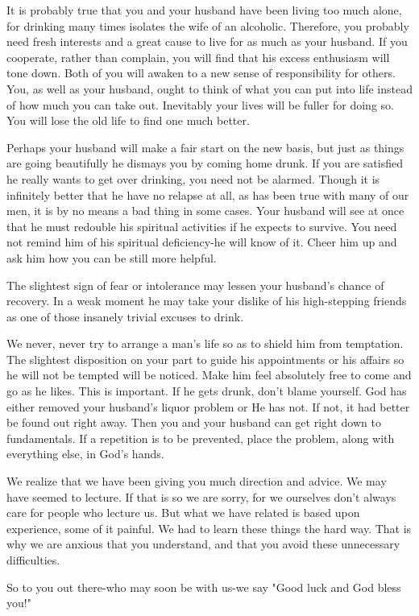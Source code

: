 \begin{biblechapter}
It is probably true that you and your husband have been living too much alone, for drinking many times isolates the wife of an alcoholic.  Therefore, you probably need fresh interests and a great cause to live for as much as your husband.  If you cooperate, rather than complain, you will find that his excess enthusiasm will tone down.  Both of you will awaken to a new sense of responsibility for others. You, as well as your husband, ought to think of what you can put into life instead of how much you can take out.  Inevitably your lives will be fuller for doing so.  You will lose the old life to find one much better.

Perhaps your husband will make a fair start on the new basis, but just as things are going beautifully he dismays you by coming home drunk.  If you are satisfied he really wants to get over drinking, you need not be alarmed.  Though it is infinitely better that he have no relapse at all, as has been true with many of our men, it is by no means a bad thing in some cases.  Your husband will see at once that he must redouble his spiritual activities if he expects to survive.  You need not remind him of his spiritual deficiency-he will know of it.  Cheer him up and ask him how you can be still more helpful.

The slightest sign of fear or intolerance may lessen your husband's chance of recovery.  In a weak moment he may take your dislike of his high-stepping friends as one of those insanely trivial excuses to drink.

We never, never try to arrange a man's life so as to shield him from temptation.  The slightest disposition on your part to guide his appointments or his affairs so he will not be tempted will be noticed.  Make him feel absolutely free to come and go as he likes.  This is important.  If he gets drunk, don't blame yourself.  God has either removed your husband's liquor problem or He has not.  If not, it had better be found out right away.  Then you and your husband can get right down to fundamentals.  If a repetition is to be prevented, place the problem, along with everything else, in God's hands.

We realize that we have been giving you much direction and advice.  We may have seemed to lecture.  If that is so we are sorry, for we ourselves don't always care for people who lecture us.  But what we have related is based upon experience, some of it painful.  We had to learn these things the hard way.  That is why we are anxious that you understand, and that you avoid these unnecessary difficulties. 

So to you out there-who may soon be with us-we say "Good luck and God bless you!"

\end{biblechapter}
